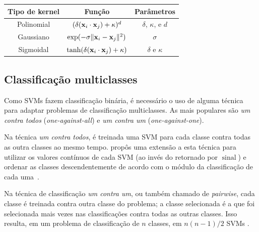 \begin{table}
\centering
\begin{tabular}{|c|c|c|}
\hline
Tipo de kernel & Função & Parâmetros \\
\hline
Polinomial & $(\delta(\mathbf{x}_i\cdot\mathbf{x}_j)+\kappa)^d$ & $\delta$, $\kappa$, e $d$ \\
Gaussiano & $\exp(-\sigma\lVert \mathbf{x}_i-\mathbf{x}_j \rVert^2)$ & $\sigma$ \\
Sigmoidal & $\tanh(\delta(\mathbf{x}_i\cdot\mathbf{x}_j)+\kappa)$ & $\delta$ e $\kappa$ \\
\hline
\end{tabular}
\label{quadro:kernels}
\end{table}

\subsection{Classificação multiclasses}\label{sec:svmmulti}


Como SVMs fazem classificação binária, é necessário o uso de alguma técnica para adaptar problemas de classificação multiclasses. As mais populares são \emph{um contra todos} (\emph{one-against-all}) e \emph{um contra um} (\emph{one-against-one}).

Na técnica \emph{um contra todos}, é treinada uma SVM para cada classe contra todas as outra classes ao mesmo tempo.  propôs uma extensão a esta técnica para utilizar os valores contínuos de cada SVM (ao invés do retornado por $\operatorname{sinal}$) e ordenar as classes descendentemente de acordo com o módulo da classificação de cada uma~\cite{abe2003analysis}.

Na técnica de classificação \emph{um contra um}, ou também chamado de \emph{pairwise}, cada classe é treinada contra outra classe do problema; a classe selecionada é a que foi selecionada mais vezes nas classificações contra todas as outras classes. Isso resulta, em um problema de classificação de $n$ classes, em $n(n - 1)/2$ SVMs \cite{kressel1999pairwise}.




